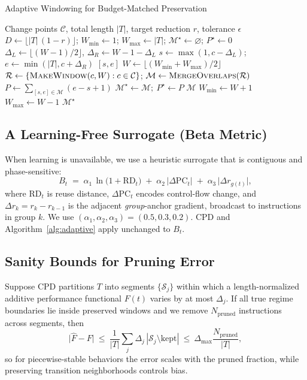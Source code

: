 \begin{algorithm}[t]
\caption{Adaptive Windowing for Budget-Matched Preservation}
\label{alg:adaptive}
\small
\begin{algorithmic}[1]
\Require Change points \(\mathcal{C}\), total length \(|T|\), target reduction \(r\), tolerance \(\epsilon\)
\State \(D\gets \lfloor |T|\,(1-r)\rfloor\); \(W_{\min}\gets 1\); \(W_{\max}\gets |T|\); \(\mathcal{M}^\star\gets\varnothing\); \(P^\star\gets 0\)
  \State \(\Delta_L\gets\lfloor(W-1)/2\rfloor\), \(\Delta_R\gets W-1-\Delta_L\)
  \State \(s\gets\max(1,c-\Delta_L)\); \(e\gets\min(|T|,c+\Delta_R)\)
  \State \Return \([s,e]\)
\EndFunction
{}
  \State \(W\gets\lfloor(W_{\min}+W_{\max})/2\rfloor\)
  \State \(\mathcal{R}\gets \{\textsc{MakeWindow}(c,W):c\in\mathcal{C}\}\); \(\mathcal{M}\gets \textsc{MergeOverlaps}(\mathcal{R})\)
  \State \(P\gets\sum_{[s,e]\in\mathcal{M}}(e-s+1)\)
   \(\mathcal{M}^\star\gets\mathcal{M};\ P^\star\gets P\) \EndIf
   \Return \(\mathcal{M}\) \EndIf
   \State \(W_{\min}\gets W+1\) \Else \State \(W_{\max}\gets W-1\) \EndIf
\EndWhile
\State \Return \(\mathcal{M}^\star\) 
\end{algorithmic}
\end{algorithm}

\subsection{A Learning-Free Surrogate (Beta Metric)}
\label{subsec:beta}
When learning is unavailable, we use a heuristic surrogate that is contiguous and phase-sensitive:
\begin{equation}
\label{eq:beta}
B_t \;=\; \alpha_1\,\ln\big(1+\mathrm{RD}_t\big)\;+\;\alpha_2\,\big|\Delta\mathrm{PC}_t\big|\;+\;\alpha_3\,\big|\Delta r_{g(t)}\big|,
\end{equation}
where \(\mathrm{RD}_t\) is reuse distance, \(\Delta\mathrm{PC}_t\) encodes control-flow change, and \(\Delta r_k=r_k-r_{k-1}\) is the adjacent \emph{group}-anchor gradient, broadcast to instructions in group \(k\). We use \((\alpha_1,\alpha_2,\alpha_3)=(0.5,0.3,0.2)\). CPD and Algorithm~\ref{alg:adaptive} apply unchanged to \(B_t\).

\subsection{Sanity Bounds for Pruning Error}
Suppose CPD partitions \(T\) into segments \(\{\mathcal{S}_j\}\) within which a length-normalized additive performance functional \(F(t)\) varies by at most \(\Delta_j\). If all true regime boundaries lie inside preserved windows and we remove \(N_{\mathrm{pruned}}\) instructions across segments, then
\[
\big|\widehat{F}-F\big|\ \le\ \frac{1}{|T|}\sum_j \Delta_j\, |\mathcal{S}_j\setminus\text{kept}|\ \le\ \Delta_{\max}\frac{N_{\mathrm{pruned}}}{|T|},
\]
so for piecewise-stable behaviors the error scales with the pruned fraction, while preserving transition neighborhoods controls bias.


